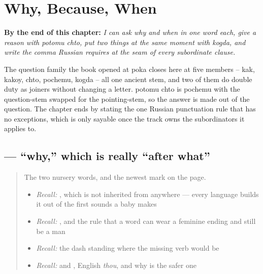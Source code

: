 
\chapter{Why, Because, When}
\label{ch:ru-why-because-when}

\begin{chapteropening}
\textbf{By the end of this chapter:} \emph{I can ask why and when in one word each, give a reason with potomu chto, put two things at the same moment with kogda, and write the comma Russian requires at the seam of every subordinate clause.}

The question family the book opened at poka closes here at five members -- kak, kakoy, chto, pochemu, kogda -- all one ancient stem, and two of them do double duty as joiners without changing a letter. potomu chto is pochemu with the question-stem swapped for the pointing-stem, so the answer is made out of the question. The chapter ends by stating the one Russian punctuation rule that has no exceptions, which is only sayable once the track owns the subordinators it applies to.
\end{chapteropening}

\section[\texorpdfstring{\ru{почему} (pachemú)}{почему (pachemú)}]{ — \textquotedblleft{}why,\textquotedblright{} which is really \textquotedblleft{}after what\textquotedblright{}}

\label{lesson:RU-C19-pochemu}



\begin{quote}
The two nursery words, and the newest mark on the page.

\begin{itemize}
\raggedright
  \item \emph{Recall:} \emph{}, which is not inherited from anywhere — every language builds it out of the first sounds a baby makes
  \item \emph{Recall:} \emph{}, and the rule that a word can wear a feminine ending and still be a man
  \item \emph{Recall:} the dash standing where the missing verb would be
  \item \emph{Recall:} \emph{} and \emph{}, English \emph{thou}, and why \emph{} is the safer one
\end{itemize}
\end{quote}

